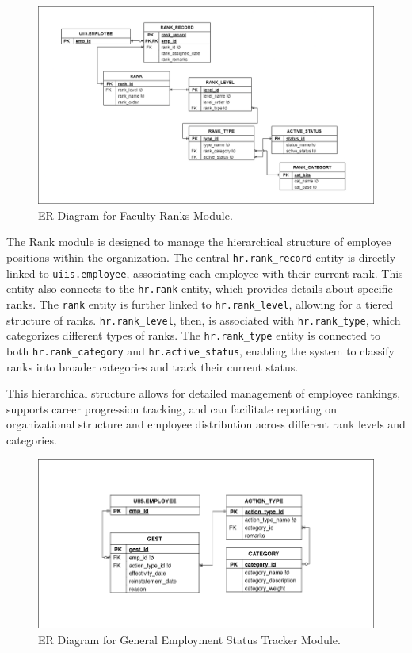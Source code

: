     \begin{figure}[H]
        \centering
        \includegraphics[width=1\linewidth]{figures/images/diagrams/erd/erd-core-rank.png}
        \caption{ER Diagram for Faculty Ranks Module.}
        \label{fig:erd-core-rank}
    \end{figure}

    The Rank module is designed to manage the hierarchical structure of employee positions within the organization. The central \texttt{hr.rank\_record} entity is directly linked to \texttt{uiis.employee}, associating each employee with their current rank. This entity also connects to the \texttt{hr.rank} entity, which provides details about specific ranks. The \texttt{rank} entity is further linked to \texttt{hr.rank\_level}, allowing for a tiered structure of ranks. \texttt{hr.rank\_level}, then, is associated with \texttt{hr.rank\_type}, which categorizes different types of ranks. The \texttt{hr.rank\_type} entity is connected to both \texttt{hr.rank\_category} and \texttt{hr.active\_status}, enabling the system to classify ranks into broader categories and track their current status. 
            
    This hierarchical structure allows for detailed management of employee rankings, supports career progression tracking, and can facilitate reporting on organizational structure and employee distribution across different rank levels and categories.

    \begin{figure}[H]
        \centering
        \includegraphics[width=1\linewidth]{figures/images/diagrams/erd/erd-core-gest.png}
        \caption{ER Diagram for General Employment Status Tracker Module.}
        \label{fig:erd-core-gest}
    \end{figure}

